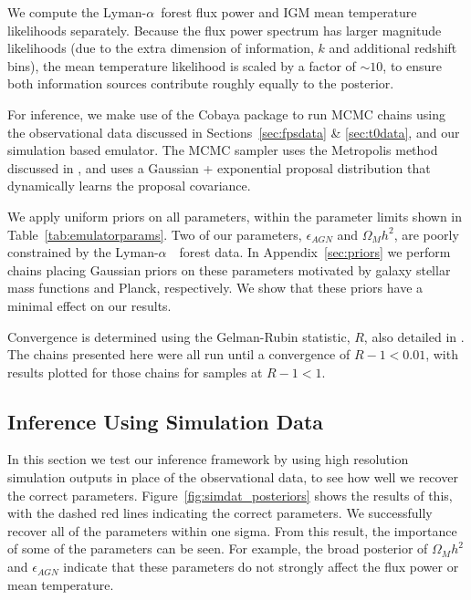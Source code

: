 \documentclass[a4paper,11pt]{article}
\newcommand{\lya}{Lyman-$\alpha$\ }
\newcommand{\Lya}{Lyman-$\alpha$\ }
\begin{document}
We compute the \lya forest flux power and IGM mean temperature likelihoods separately. Because the flux power spectrum has larger magnitude likelihoods (due to the extra dimension of information, $k$ and additional redshift bins), the mean temperature likelihood is scaled by a factor of $\sim 10$, to ensure both information sources contribute roughly equally to the posterior.

For inference, we make use of the Cobaya package \cite{2021JCAP...05..057T, 2019ascl.soft10019T, 2013PhRvD..87j3529L, 2002PhRvD..66j3511L} to run MCMC chains using the observational data discussed in Sections~\ref{sec:fpsdata} \& \ref{sec:t0data}, and our simulation based emulator.
The MCMC sampler uses the Metropolis method discussed in \cite{2013PhRvD..87j3529L}, and uses a Gaussian + exponential proposal distribution that dynamically learns the proposal covariance.

We apply uniform priors on all parameters, within the parameter limits shown in Table~\ref{tab:emulatorparams}. Two of our parameters, $\epsilon_{AGN}$ and $\Omega_M h^2$, are poorly constrained by the \Lya~forest data. In Appendix~\ref{sec:priors} we perform chains placing Gaussian priors on these parameters motivated by galaxy stellar mass functions and Planck, respectively. We show that these priors have a minimal effect on our results.

Convergence is determined using the Gelman-Rubin statistic, $R$, also detailed in \cite{2013PhRvD..87j3529L}.
The chains presented here were all run until a convergence of $R-1 < 0.01$, with results plotted for those chains for samples at $R-1 < 1$.

\subsection{Inference Using Simulation Data}\label{sec:simdat}

In this section we test our inference framework by using high resolution simulation outputs in place of the observational data, to see how well we recover the correct parameters.
Figure~\ref{fig:simdat_posteriors} shows the results of this, with the dashed red lines indicating the correct parameters.
We successfully recover all of the parameters within one sigma.
From this result, the importance of some of the parameters can be seen.
For example, the broad posterior of $\Omega_M h^2$ and $\epsilon_{AGN}$ indicate that these parameters do not strongly affect the flux power or mean temperature.
\end{document}
